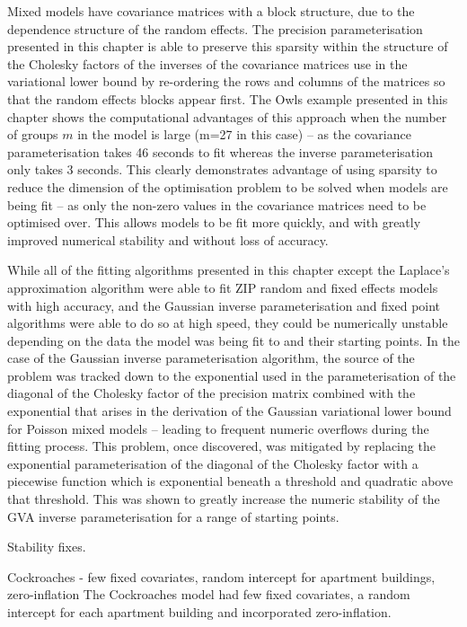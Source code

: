 			Mixed models have covariance matrices with a block structure, due to the dependence structure of the
			random effects. The precision parameterisation presented in this chapter is able to preserve this
			sparsity within the structure of the Cholesky factors of the inverses of the covariance matrices use in
			the variational lower bound by re-ordering the rows and columns of the matrices so that the random
			effects blocks appear first. The Owls example presented in this chapter shows the computational
			advantages of this approach when the number of groups $m$ in the model is large (m=27 in this case) --
			as the covariance parameterisation takes 46 seconds to fit whereas the inverse parameterisation only
			takes 3 seconds. This clearly demonstrates advantage of using sparsity to reduce the dimension of the
			optimisation problem to be solved when models are being fit -- as only the non-zero values in the
			covariance matrices need to be optimised over. This allows models to be fit more quickly, and with
			greatly improved numerical stability and without loss of accuracy.

			While all of the fitting algorithms presented in this chapter except the Laplace's approximation
			algorithm were able to fit ZIP random and fixed effects models with high accuracy, and the 
			Gaussian inverse parameterisation and fixed point algorithms were able to do so at high speed, they 
			could be numerically unstable depending on the data the model was being fit to and their starting points.
			In the case of the Gaussian inverse parameterisation algorithm, the source of the problem was tracked down
			to the exponential used in the parameterisation of the diagonal of the Cholesky factor of the precision
			matrix combined with the exponential that arises in the derivation of the Gaussian variational lower
			bound for Poisson mixed models -- leading to frequent numeric overflows during the fitting process. This
			problem, once discovered, was mitigated by replacing the exponential parameterisation of the diagonal
			of the Cholesky factor with a piecewise function which is exponential beneath a threshold and quadratic
			above that threshold. This was shown to greatly increase the numeric stability of the GVA inverse
			parameterisation for a range of starting points.

			Stability fixes.

			Cockroaches - few fixed covariates, random intercept for apartment buildings, zero-inflation
			The Cockroaches model had few fixed covariates, a random intercept for each apartment building
			and incorporated zero-inflation.

